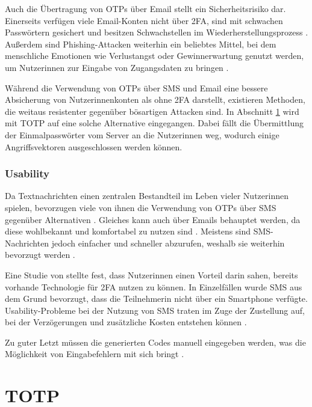 Auch die Übertragung von \acp{OTP} über Email stellt ein Sicherheitsrisiko dar. Einerseits verfügen viele Email-Konten nicht über \ac{2FA}, sind mit schwachen Passwörtern gesichert und besitzen Schwachstellen im Wiederherstellungsprozess \parencite{khannaAnatomyCompromising2012}. Außerdem sind Phishing-Attacken weiterhin ein beliebtes Mittel, bei dem menschliche Emotionen wie Verlustangst oder Gewinnerwartung genutzt werden, um Nutzerinnen zur Eingabe von Zugangsdaten zu bringen \parencite{goelGotPhished2017}.

\pskip
Während die Verwendung von \acp{OTP} über SMS und Email eine bessere Absicherung von Nutzerinnenkonten als ohne \ac{2FA} darstellt, existieren Methoden, die weitaus resistenter gegenüber bösartigen Attacken sind. In Abschnitt \ref{sec:totp} wird mit \ac{TOTP} auf eine solche Alternative eingegangen. Dabei fällt die Übermittlung der Einmalpasswörter vom Server an die Nutzerinnen weg, wodurch einige Angriffsvektoren ausgeschlossen werden können.

\subsubsection{Usability}

Da Textnachrichten einen zentralen Bestandteil im Leben vieler Nutzerinnen spielen, bevorzugen viele von ihnen die Verwendung von \acp{OTP} über SMS gegenüber Alternativen \parencite{peetersSMSOTP2022}. Gleiches kann auch über Emails behauptet werden, da diese wohlbekannt und komfortabel zu nutzen sind \parencite{vishwakarmaSecureImage2016}. Meistens sind SMS-Nachrichten jedoch einfacher und schneller abzurufen, weshalb sie weiterhin bevorzugt werden \parencite{peetersSMSOTP2022}.

Eine Studie von \textcite{decristofaroComparativeUsability2014} stellte fest, dass Nutzerinnen einen Vorteil darin sahen, bereits vorhande Technologie für \ac{2FA} nutzen zu können. In Einzelfällen wurde SMS aus dem Grund bevorzugt, dass die Teilnehmerin nicht über ein Smartphone verfügte. Usability-Probleme bei der Nutzung von SMS traten im Zuge der Zustellung auf, bei der Verzögerungen und zusätzliche Kosten entstehen können \parencite{decristofaroComparativeUsability2014}.

Zu guter Letzt müssen die generierten Codes manuell eingegeben werden, was die Möglichkeit von Eingabefehlern mit sich bringt \parencite{decristofaroComparativeUsability2014}.

\section{TOTP}
\label{sec:totp}

